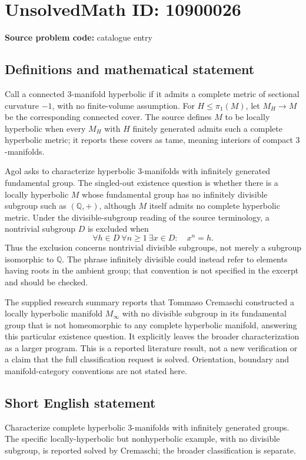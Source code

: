 \documentclass[11pt]{article}
\newcommand{\Q}{\mathbb{Q}}
\begin{document}
\section*{UnsolvedMath ID: 10900026}
\textbf{Source problem code:} catalogue entry
\subsection{Definitions and mathematical statement}
Call a connected \(3\)-manifold hyperbolic if it admits a complete metric of sectional curvature \(-1\), with no finite-volume assumption. For \(H\leq\pi_1(M)\), let \(M_H\to M\) be the corresponding connected cover. The source defines \(M\) to be locally hyperbolic when every \(M_H\) with \(H\) finitely generated admits such a complete hyperbolic metric; it reports these covers as tame, meaning interiors of compact \(3\)-manifolds.

Agol asks to characterize hyperbolic \(3\)-manifolds with infinitely generated fundamental group. The singled-out existence question is whether there is a locally hyperbolic \(M\) whose fundamental group has no infinitely divisible subgroup such as \((\Q,+)\), although \(M\) itself admits no complete hyperbolic metric. Under the divisible-subgroup reading of the source terminology, a nontrivial subgroup \(D\) is excluded when
\[
 \forall h\in D\ \forall n\geq1\ \exists x\in D:\quad x^n=h.
\]
Thus the exclusion concerns nontrivial divisible subgroups, not merely a subgroup isomorphic to \(\Q\). The phrase infinitely divisible could instead refer to elements having roots in the ambient group; that convention is not specified in the excerpt and should be checked.

The supplied research summary reports that Tommaso Cremaschi constructed a locally hyperbolic manifold \(M_\infty\) with no divisible subgroup in its fundamental group that is not homeomorphic to any complete hyperbolic manifold, answering this particular existence question. It explicitly leaves the broader characterization as a larger program. This is a reported literature result, not a new verification or a claim that the full classification request is solved. Orientation, boundary and manifold-category conventions are not stated here.
\subsection{Short English statement}
Characterize complete hyperbolic \(3\)-manifolds with infinitely generated groups. The specific locally-hyperbolic but nonhyperbolic example, with no divisible subgroup, is reported solved by Cremaschi; the broader classification is separate.
\end{document}
